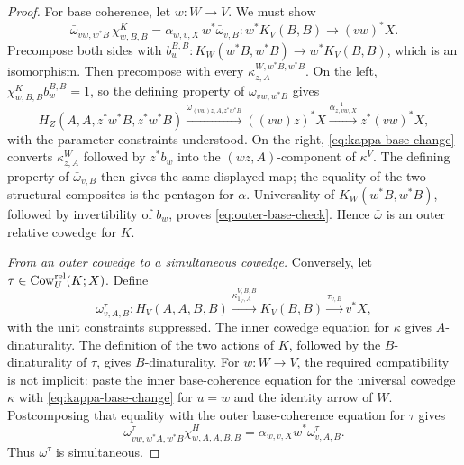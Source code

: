 \begin{proof}
For base coherence, let \(w:W\to V\).  We must show
\begin{equation}
  \bar\omega_{vw,w^*B}\,\chi^K_{w,B,B}
  =\alpha_{w,v,X}\,w^*\bar\omega_{v,B}
  :w^*K_V(B,B)\longrightarrow(vw)^*X.
  \label{eq:outer-base-check}
\end{equation}
Precompose both sides with
\(b_w^{B,B}:K_W(w^*B,w^*B)\to w^*K_V(B,B)\), which is an isomorphism.
Then precompose with every
\(\kappa^{W,w^*B,w^*B}_{z,A}\).  On the left,
\(\chi^K_{w,B,B}b_w^{B,B}=1\), so the defining property of
\(\bar\omega_{vw,w^*B}\) gives
\[
 H_Z(A,A,z^*w^*B,z^*w^*B)
 \xrightarrow{\omega_{(vw)z,A,z^*w^*B}}((vw)z)^*X
 \xrightarrow{\alpha^{-1}_{z,vw,X}}z^*(vw)^*X,
\]
with the parameter constraints understood.  On the right,
\cref{eq:kappa-base-change} converts
\(\kappa^W_{z,A}\) followed by \(z^*b_w\) into the
\((wz,A)\)-component of \(\kappa^V\).  The defining property of
\(\bar\omega_{v,B}\) then gives the same displayed map; the equality of the
two structural composites is the pentagon for \(\alpha\).
Universality of \(K_W(w^*B,w^*B)\), followed by invertibility of \(b_w\),
proves \cref{eq:outer-base-check}.  Hence
\(\bar\omega\) is an outer relative cowedge for \(K\).

\emph{From an outer cowedge to a simultaneous cowedge.}
Conversely, let
\(\tau\in\operatorname{Cow}^{\mathrm{rel}}_U(K;X)\).  Define
\begin{equation}
  \omega^\tau_{v,A,B}:
  H_V(A,A,B,B)
  \xrightarrow{\kappa^{V,B,B}_{1_V,A}}K_V(B,B)
  \xrightarrow{\tau_{v,B}}v^*X,
  \label{eq:uncurried-cowedge}
\end{equation}
with the unit constraints suppressed.  The inner cowedge equation for
\(\kappa\) gives \(A\)-dinaturality.  The definition of the two actions of
\(K\), followed by the \(B\)-dinaturality of \(\tau\), gives
\(B\)-dinaturality.  For \(w:W\to V\), the required compatibility is not
implicit: paste the inner base-coherence equation for the universal cowedge
\(\kappa\) with \cref{eq:kappa-base-change} for \(u=w\) and the identity
arrow of \(W\).  Postcomposing that equality with the outer
base-coherence equation for \(\tau\) gives
\[
  \omega^\tau_{vw,w^*A,w^*B}\chi^H_{w,A,A,B,B}
  =\alpha_{w,v,X}w^*\omega^\tau_{v,A,B}.
\]
Thus \(\omega^\tau\) is simultaneous.


\end{proof}
